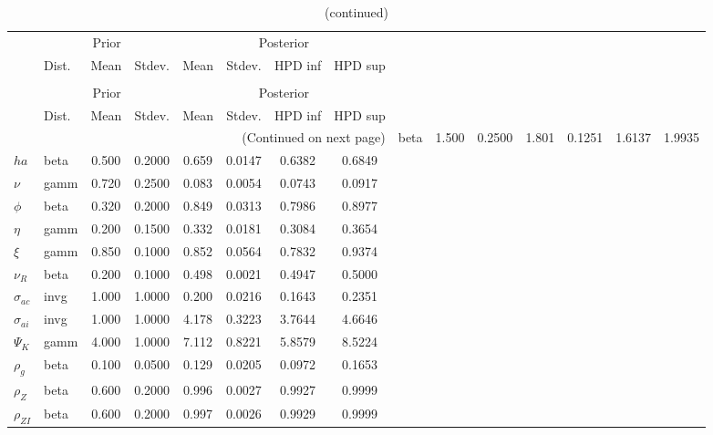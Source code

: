  
\begin{center}
\begin{longtable}{llcccccc} 
\caption{Results from Metropolis-Hastings (parameters)}
 \label{Table:MHPosterior:1}\\
\toprule 
  & \multicolumn{3}{c}{Prior}  &  \multicolumn{4}{c}{Posterior} \\
  \cmidrule(r{.75em}){2-4} \cmidrule(r{.75em}){5-8}
  & Dist. & Mean  & Stdev. & Mean & Stdev. & HPD inf & HPD sup\\
\midrule \endfirsthead 
\caption{(continued)}\\\toprule 
  & \multicolumn{3}{c}{Prior}  &  \multicolumn{4}{c}{Posterior} \\
  \cmidrule(r{.75em}){2-4} \cmidrule(r{.75em}){5-8}
  & Dist. & Mean  & Stdev. & Mean & Stdev. & HPD inf & HPD sup\\
\midrule \endhead 
\bottomrule \multicolumn{8}{r}{(Continued on next page)} \endfoot 
\bottomrule \endlastfoot 
${\sigma}$ & beta &   1.500 & 0.2500 &   1.801& 0.1251 &  1.6137 &  1.9935 \\ 
${ha}$ & beta &   0.500 & 0.2000 &   0.659& 0.0147 &  0.6382 &  0.6849 \\ 
$\nu$ & gamm &   0.720 & 0.2500 &   0.083& 0.0054 &  0.0743 &  0.0917 \\ 
${\phi}$ & beta &   0.320 & 0.2000 &   0.849& 0.0313 &  0.7986 &  0.8977 \\ 
${\eta}$ & gamm &   0.200 & 0.1500 &   0.332& 0.0181 &  0.3084 &  0.3654 \\ 
$\xi$ & gamm &   0.850 & 0.1000 &   0.852& 0.0564 &  0.7832 &  0.9374 \\ 
${\nu_R}$ & beta &   0.200 & 0.1000 &   0.498& 0.0021 &  0.4947 &  0.5000 \\ 
${\sigma_{ac}}$ & invg &   1.000 & 1.0000 &   0.200& 0.0216 &  0.1643 &  0.2351 \\ 
${\sigma_{ai}}$ & invg &   1.000 & 1.0000 &   4.178& 0.3223 &  3.7644 &  4.6646 \\ 
${\Psi_{K}}$ & gamm &   4.000 & 1.0000 &   7.112& 0.8221 &  5.8579 &  8.5224 \\ 
${\rho_g}$ & beta &   0.100 & 0.0500 &   0.129& 0.0205 &  0.0972 &  0.1653 \\ 
${\rho_Z}$ & beta &   0.600 & 0.2000 &   0.996& 0.0027 &  0.9927 &  0.9999 \\ 
${\rho_{ZI}}$ & beta &   0.600 & 0.2000 &   0.997& 0.0026 &  0.9929 &  0.9999 \\ 

\end{longtable}
\end{center}
